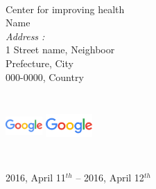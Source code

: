 \begin{titlepage}
\begin{center}
\end{center}

\vfill

\begin{center}
\large {}\\[0.1cm]
Center for improving health\\
Name\\[.4cm]
\textit{Address :}\\
1 Street name, Neighboor\\
Prefecture, City\\
000-0000, Country 
\end{center}

\begin{center}
	\includegraphics[height = 70pt, width = 40pt]{logos/logo.png}\qquad
	\includegraphics[height = 70pt, width = 50pt]{logos/logo.png}
\end{center}

\begin{center}
{\large 2016, April 11$^{th}$ -- 2016, April 12$^{th}$}
\end{center}

\vfill

\end{titlepage}
\restoregeometry{}
